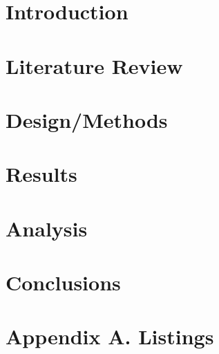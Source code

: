 \documentclass[a4paper,12pt,oneside]{book}
\begin{document}

\frontmatter

\clearpage

\clearpage





\mainmatter
\setcounter{page}{1}
\chapter{Introduction}

\chapter{Literature Review}

\chapter{Design/Methods}

\chapter{Results}

\chapter{Analysis}

\chapter{Conclusions}


\backmatter


\nocite{*}


\appendix
\chapter{Appendix A. Listings}

%

%

%


\end{document}
